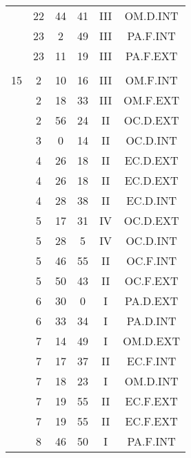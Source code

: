 \documentclass[12pt, a4paper]{article}
\begin{document}
\begin{multicols}{3}
{\begin{tabular}{c c c c c c}
	 	 	 	 & 22 & 44 & 41 & III & OM.D.INT\\%
	 	 	 	 & 23 & 2 & 49 & III & PA.F.INT\\%
	 	 	 	 & 23 & 11 & 19 & III & PA.F.EXT\\%
	 	 	 	 & & & & & \\%
	 	 	 	15 & 2 & 10 & 16 & III & OM.F.INT\\%
	 	 	 	 & 2 & 18 & 33 & III & OM.F.EXT\\%
	 	 	 	 & 2 & 56 & 24 & II & OC.D.EXT\\%
	 	 	 	 & 3 & 0 & 14 & II & OC.D.INT\\%
	 	 	 	 & 4 & 26 & 18 & II & EC.D.EXT\\%
	 	 	 	 & 4 & 26 & 18 & II & EC.D.EXT\\%
	 	 	 	 & 4 & 28 & 38 & II & EC.D.INT\\%
	 	 	 	 & 5 & 17 & 31 & IV & OC.D.EXT\\%
	 	 	 	 & 5 & 28 & 5 & IV & OC.D.INT\\%
	 	 	 	 & 5 & 46 & 55 & II & OC.F.INT\\%
	 	 	 	 & 5 & 50 & 43 & II & OC.F.EXT\\%
	 	 	 	 & 6 & 30 & 0 & I & PA.D.EXT\\%
	 	 	 	 & 6 & 33 & 34 & I & PA.D.INT\\%
	 	 	 	 & 7 & 14 & 49 & I & OM.D.EXT\\%
	 	 	 	 & 7 & 17 & 37 & II & EC.F.INT\\%
	 	 	 	 & 7 & 18 & 23 & I & OM.D.INT\\%
	 	 	 	 & 7 & 19 & 55 & II & EC.F.EXT\\%
	 	 	 	 & 7 & 19 & 55 & II & EC.F.EXT\\%
	 	 	 	 & 8 & 46 & 50 & I & PA.F.INT\\%

\end{tabular}}
\end{multicols}
\end{document}
